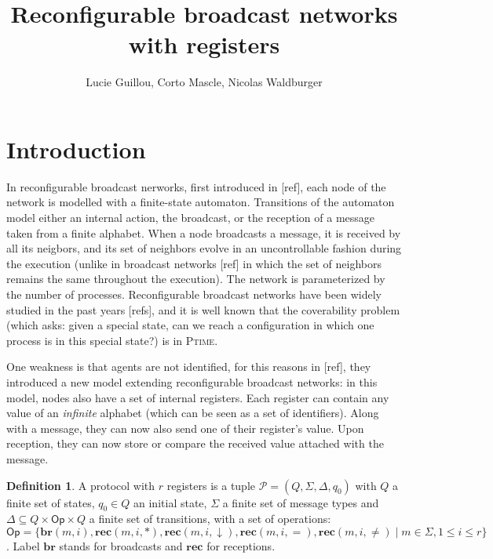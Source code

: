 \documentclass{article}
\title{Reconfigurable broadcast networks with registers}
\author{Lucie Guillou, Corto Mascle, Nicolas Waldburger}
\date{}
\newcommand{\set}[1]{\{#1\}}
\theoremstyle{definition}
\newtheorem{definition}[theorem]{Definition}
\begin{document}
	
	\maketitle
	
	\section{Introduction}
	
	
	
	In reconfigurable broadcast nerworks, first introduced in [ref], each node of the network is modelled with a finite-state automaton. Transitions of the automaton model either an internal action, the broadcast, or the reception of a message taken from a finite alphabet. When a node broadcasts a message, it is received by all its neigbors, and its set of neighbors evolve in an uncontrollable fashion during the execution (unlike in broadcast networks [ref] in which the set of neighbors remains the same throughout the execution). The network is parameterized by the number of processes. Reconfigurable broadcast networks have been widely studied in the past years [refs], and it is well known that the coverability problem (which asks: given a special state, can we reach a configuration in which one process is in this special state?) is in \textsc{Ptime}.
	
	One weakness is that agents are not identified, for this reasons in [ref], they introduced a new model extending reconfigurable broadcast networks: in this model, nodes also have a set of internal registers. Each register can contain any value of an \emph{infinite} alphabet (which can be seen as a set of identifiers). Along with a message, they can now also send one of their register's value. Upon reception, they can now store or compare the received value attached with the message.
	
	
	\begin{definition}
		A protocol with $r$ registers is a tuple $\mathcal{P} = (Q, \Sigma, \Delta, q_0)$  with $Q$ a finite set of states, $q_0 \in Q$ an initial state, $\Sigma$ a finite set of message types  and $\Delta \subseteq Q \times \mathsf{Op} \times Q$ a finite set of transitions, with a set of operations: $\mathsf{Op} = \set{\mathbf{br}(m,i), \mathbf{rec}(m,i, \ast), \mathbf{rec}(m,i, \downarrow), \mathbf{rec}(m,i, =),\mathbf{rec}(m,i, \neq) \mid m \in \Sigma, 1 \leq i \leq r}$.
		Label $\mathbf{br}$ stands for broadcasts and $\mathbf{rec}$ for receptions.
		
	\end{definition}
	
\end{document}
